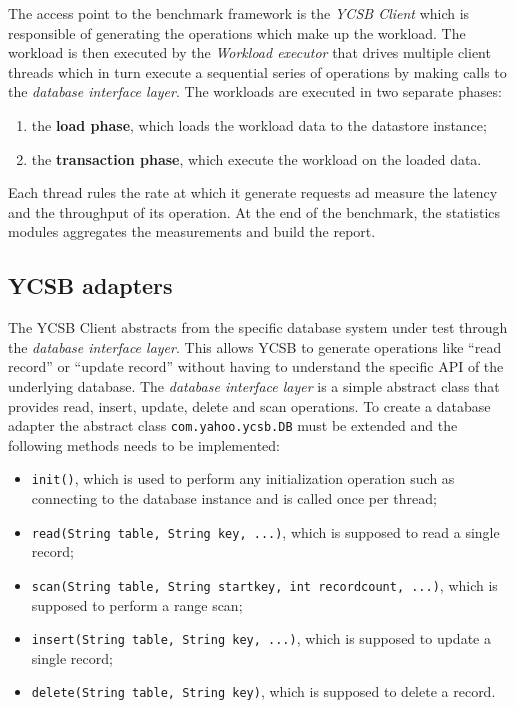 \newparagraph The access point to the benchmark framework is the \textit{YCSB Client} which is responsible of generating the operations which make up the workload. The workload is then executed by the \textit{Workload executor} that drives multiple client threads which in turn execute a sequential series of operations by making calls to the \textit{database interface layer}.
The workloads are executed in two separate phases:
\begin{enumerate}
\item the \textbf{load phase}, which loads the workload data to the datastore instance;
\item the \textbf{transaction phase}, which execute the workload on the loaded data.
\end{enumerate}
\noindent Each thread rules the rate at which it generate requests ad measure the latency and the throughput of its operation. At the end of the benchmark, the statistics modules aggregates the measurements and build the report.

\subsection{YCSB adapters}
The YCSB Client abstracts from the specific database system under test through the \textit{database interface layer}. This allows YCSB to generate operations like ``read record'' or ``update record'' without having to understand the specific API of the underlying database. The  \textit{database interface layer} is a simple abstract class that provides read, insert, update, delete and scan operations. 
\noindent To create a database adapter the abstract class \texttt{com.yahoo.ycsb.DB} must be extended and the following methods needs to be implemented:
\begin{itemize}
\item \texttt{init()}, which is used to perform any initialization operation such as connecting to the database instance and is called once per thread;
\item \texttt{read(String table, String key, ...)}, which is supposed to read a single record;
\item \texttt{scan(String table, String startkey, int recordcount, ...)}, which is supposed to perform a range scan;
\item \texttt{insert(String table, String key, ...)}, which is supposed to update a single record;
\item \texttt{delete(String table, String key)}, which is supposed to delete a record.
\end{itemize}

